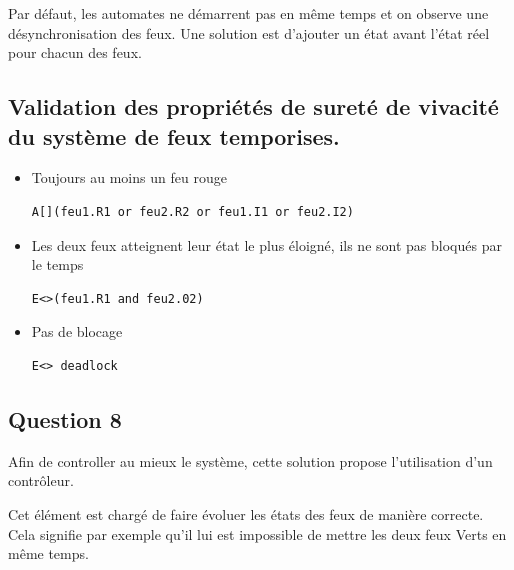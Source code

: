\documentclass[11pt]{article}
\begin{document}
Par défaut, les automates ne démarrent pas en même temps et on observe une désynchronisation des feux. Une solution est d'ajouter un état avant l'état réel pour chacun des feux. 


\subsection*{Validation des propriétés de sureté de vivacité du système de feux temporises.}

\begin{itemize}
	\item Toujours au moins un feu rouge
\begin{verbatim}
A[](feu1.R1 or feu2.R2 or feu1.I1 or feu2.I2)
\end{verbatim}

	\item Les deux feux atteignent leur état le plus éloigné, ils ne sont pas bloqués par le temps
\begin{verbatim}
E<>(feu1.R1 and feu2.02)	
\end{verbatim}

	\item Pas de blocage
\begin{verbatim}
E<> deadlock
\end{verbatim}

\end{itemize}

\subsection{Question 8}

Afin de controller au mieux le système, cette solution propose l'utilisation d'un contrôleur. 

Cet élément est chargé de faire évoluer les états des feux de manière correcte. Cela signifie par exemple qu'il lui est impossible de mettre les deux feux Verts en même temps.
\end{document}

